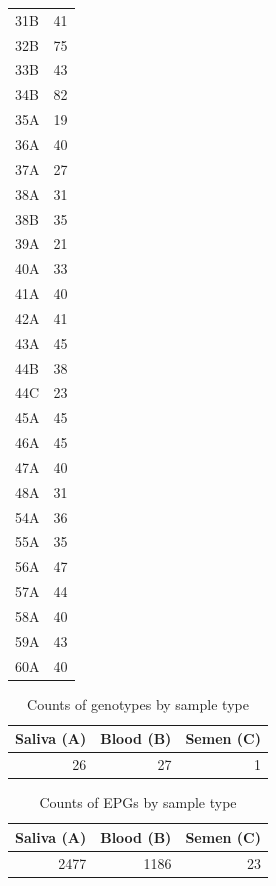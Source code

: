 \begin{longtable}{lr}
      31B &    41 \\
      32B &    75 \\
      33B &    43 \\
      34B &    82 \\
      35A &    19 \\
      36A &    40 \\
      37A &    27 \\
      38A &    31 \\
      38B &    35 \\
      39A &    21 \\
      40A &    33 \\
      41A &    40 \\
      42A &    41 \\
      43A &    45 \\
      44B &    38 \\
      44C &    23 \\
      45A &    45 \\
      46A &    45 \\
      47A &    40 \\
      48A &    31 \\
      54A &    36 \\
      55A &    35 \\
      56A &    47 \\
      57A &    44 \\
      58A &    40 \\
      59A &    43 \\
      60A &    40 \\
\end{longtable}

\begin{table}[H]
\centering
\begin{tabular}{rrr}
\toprule
 Saliva (A) &  Blood (B) &  Semen (C) \\
\midrule
         26 &         27 &          1 \\
\bottomrule
\end{tabular}
\caption{Counts of genotypes by sample type}
\label{table:Counts of genotypes by sample type}
\end{table}

\begin{table}[H]
\centering
\begin{tabular}{rrr}
\toprule
 Saliva (A) &  Blood (B) &  Semen (C) \\
\midrule
       2477 &       1186 &         23 \\
\bottomrule
\end{tabular}
\caption{Counts of EPGs by sample type}
\label{table:Counts of EPGs by sample type}
\end{table}

